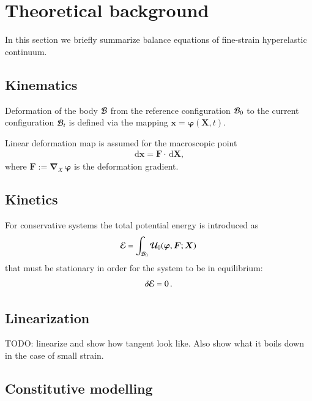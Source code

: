\documentclass[preprint,12pt,times]{elsarticle}
\def\gz  #1{           \mbox{$\boldsymbol{#1}$}}
\def\d {\,\mbox{d}}
\def\mcl  #1{               {\cal #1}}
\begin{document}
\section{Theoretical background}
\label{sec:theory}

In this section we briefly summarize balance equations of fine-strain hyperelastic continuum.

\subsection{Kinematics}

Deformation of the body $\mcl B$ from the reference configuration $\mcl B_0$ to the current configuration $\mcl B_t$
is defined via the mapping $\gz x = \gz \varphi (\gz X,t)$.

Linear deformation map is assumed for the macroscopic point
\begin{align}
\d \gz x = \gz F \cdot \d \gz X,
\end{align}
where $\gz F := \gz \nabla_{X} \, \gz \varphi$ is the deformation gradient.

\subsection{Kinetics}

For conservative systems the total potential energy is introduced as
\begin{align}
\mcl E = \int_{\mcl B_0} \mcl U_0(\gz \varphi, \gz F; \gz X) \,
\end{align}
that must be stationary in order for the system to be in equilibrium:
\begin{align}
\delta \mcl E = 0 \, .
\label{eq:stationary}
\end{align}

\subsection{Linearization}

{\color{red}TODO: linearize and show how tangent look like.
Also show what it boils down in the case of small strain.
}

\subsection{Constitutive modelling}
\end{document}
